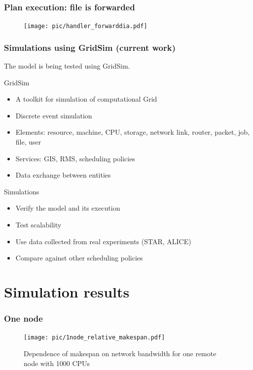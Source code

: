 \documentclass{beamer}
\begin{document}
\begin{frame}\frametitle{Plan execution: file is forwarded}
\begin{figure}[h]
		\texttt{[image: pic/handler\_forwarddia.pdf]}
	\label{real_network}
\end{figure} 
\end{frame}


\begin{frame}\frametitle{Simulations using GridSim (current work)}
The model is being tested using GridSim.
\begin{block}{GridSim}
  \begin{itemize}
    \item A toolkit for simulation of computational Grid
    \item Discrete event simulation 
    \item Elements: resource, machine, CPU, storage, network link, router, packet, job, file, user
    \item Services: GIS, RMS, scheduling policies
    \item Data exchange between entities
  \end{itemize}
\end{block}

\begin{block}{Simulations}
  \begin{itemize}
    \item Verify the model and its execution
    \item Test scalability
    \item Use data collected from real experiments (STAR, ALICE)
    \item Compare against other scheduling policies 
  \end{itemize}
\end{block}


\end{frame}




\section{Simulation results}
\begin{frame}\frametitle{One node}
\begin{figure}[h]

\centering
    \texttt{[image: pic/1node\_relative\_makespan.pdf]}

    \caption{Dependence of makespan on network bandwidth for one remote node with 1000 CPUs}
    \label{fig:simulated grig}

\end{figure}
\end{frame}
\end{document}
